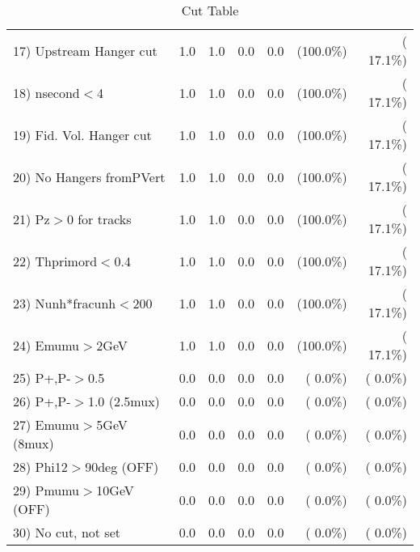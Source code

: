 \begin{table}[h!]
\begin{tabular}{||l||r|r|r|r|r|r||}
 17) Upstream Hanger cut  &          1.0 &          1.0 &          0.0 &          0.0 & (100.0\%) & ( 17.1\%) \\
 18) nsecond$<$4          &          1.0 &          1.0 &          0.0 &          0.0 & (100.0\%) & ( 17.1\%) \\
 19) Fid. Vol. Hanger cut &          1.0 &          1.0 &          0.0 &          0.0 & (100.0\%) & ( 17.1\%) \\
 20) No Hangers fromPVert &          1.0 &          1.0 &          0.0 &          0.0 & (100.0\%) & ( 17.1\%) \\
 21) Pz$>$0 for tracks    &          1.0 &          1.0 &          0.0 &          0.0 & (100.0\%) & ( 17.1\%) \\
 22) Thprimord$<$0.4      &          1.0 &          1.0 &          0.0 &          0.0 & (100.0\%) & ( 17.1\%) \\
 23) Nunh*fracunh$<$200   &          1.0 &          1.0 &          0.0 &          0.0 & (100.0\%) & ( 17.1\%) \\
 24) Emumu$>$2GeV         &          1.0 &          1.0 &          0.0 &          0.0 & (100.0\%) & ( 17.1\%) \\
 25) P+,P-$>$0.5          &          0.0 &          0.0 &          0.0 &          0.0 & (  0.0\%) & (  0.0\%) \\
 26) P+,P-$>$1.0 (2.5mux) &          0.0 &          0.0 &          0.0 &          0.0 & (  0.0\%) & (  0.0\%) \\
 27) Emumu$>$5GeV  (8mux) &          0.0 &          0.0 &          0.0 &          0.0 & (  0.0\%) & (  0.0\%) \\
 28) Phi12$>$90deg  (OFF) &          0.0 &          0.0 &          0.0 &          0.0 & (  0.0\%) & (  0.0\%) \\
 29) Pmumu$>$10GeV  (OFF) &          0.0 &          0.0 &          0.0 &          0.0 & (  0.0\%) & (  0.0\%) \\
 30) No cut, not set      &          0.0 &          0.0 &          0.0 &          0.0 & (  0.0\%) & (  0.0\%) \\
 \hline
 \hline
 \end{tabular}
 \caption{Cut Table           }
 \label{tab-cutheavy_neutrino_0.350}
 \end{table}
